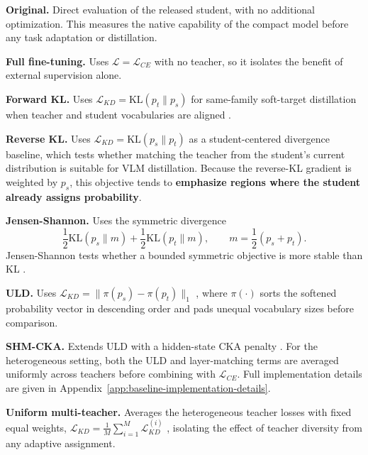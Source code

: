 \textbf{Original.} Direct evaluation of the released student, with no additional
optimization. This measures the native capability of the compact model before
any task adaptation or distillation.

\textbf{Full fine-tuning.} Uses \(\mathcal{L}=\mathcal{L}_{CE}\) with no
teacher, so it isolates the benefit of external supervision alone.

\textbf{Forward KL.} Uses
\(\mathcal{L}_{KD}=\mathrm{KL}(p_t\|p_s)\) for same-family soft-target
distillation when teacher and student vocabularies are aligned
\cite{hinton2015distillingknowledgeneuralnetwork}.

\textbf{Reverse KL.} Uses \(\mathcal{L}_{KD}=\mathrm{KL}(p_s\|p_t)\)
\cite{cui2024sinkhorn,wen2023fdistill} as a student-centered divergence
baseline, which tests whether matching the teacher from the student's current
distribution is suitable for VLM distillation. Because the reverse-KL gradient
is weighted by \(p_s\), this objective tends to \textbf{emphasize regions where the
student already assigns probability}.

\textbf{Jensen-Shannon.} Uses the symmetric divergence
\[
\frac{1}{2}\mathrm{KL}(p_s\|m)+\frac{1}{2}\mathrm{KL}(p_t\|m),
\qquad
m=\frac{1}{2}(p_s+p_t).
\]
Jensen-Shannon tests whether a bounded symmetric objective is more stable than KL
\cite{lin1991jensen}.

\textbf{ULD.} Uses \(\mathcal{L}_{KD}=\|\pi(p_s)-\pi(p_t)\|_1\)
\cite{boizard2024towardscrosstokenizerdistillation}, where \(\pi(\cdot)\)
sorts the softened probability vector in descending order and pads unequal
vocabulary sizes before comparison.

\textbf{SHM-CKA.} Extends ULD with a hidden-state CKA penalty
\cite{boizard2024towardscrosstokenizerdistillation,dasgupta2025improving,kornblith2019similarityrepresentations}.
For the heterogeneous setting, both the ULD and layer-matching terms are
averaged uniformly across teachers before combining with \(\mathcal{L}_{CE}\).
Full implementation details are given in
Appendix~\ref{app:baseline-implementation-details}.

\textbf{Uniform multi-teacher.} Averages the heterogeneous teacher losses with
fixed equal weights,
\(\mathcal{L}_{KD}=\frac{1}{M}\sum_{i=1}^{M}\mathcal{L}_{KD}^{(i)}\)
\cite{yuan2020reinforcedmultiteacherselection,zhang2023adaptivemultiteachermetalearning},
isolating the effect of teacher diversity from any adaptive assignment.

